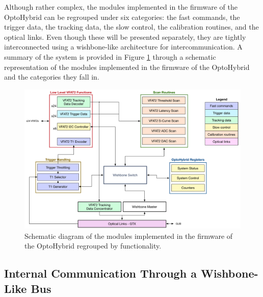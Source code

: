     Although rather complex, the modules implemented in the firmware of the OptoHybrid can be regrouped under six categories: the fast commands, the trigger data, the tracking data, the slow control, the calibration routines, and the optical links. Even though these will be presented separately, they are tightly interconnected using a wishbone-like \cite{wishbone} architecture for intercommunication. A summary of the system is provided in Figure \ref{fig:II-3-sys} through a schematic representation of the modules implemented in the firmware of the OptoHybrid and the categories they fall in.

    \begin{figure}[h!]
      \centering
      \includegraphics[width=\textwidth]{img/II-3-test-beam/system}
      \caption{Schematic diagram of the modules implemented in the firmware of the OptoHybrid regrouped by functionality.}
      \label{fig:II-3-sys}
    \end{figure}

    \subsection{Internal Communication Through a Wishbone-Like Bus}

